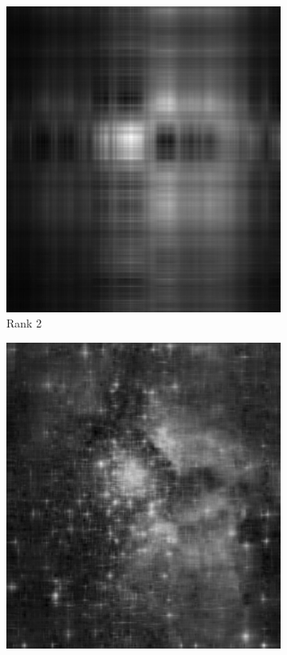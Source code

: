 \begin{figure}[H]
\centering
\begin{subfigure}{.32\textwidth}
    \centering
    \includegraphics[width=\textwidth]{figures/rank2.pdf}
    \caption{Rank 2}
\end{subfigure}
%
\begin{subfigure}{.32\textwidth}
    \centering
    \includegraphics[width=\textwidth]{figures/rank20.pdf}

\end{subfigure}
\end{figure}
